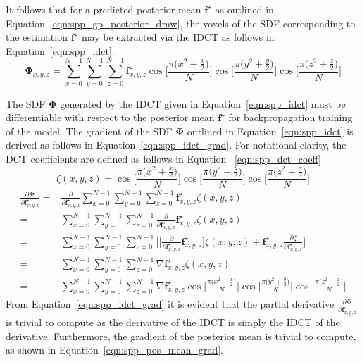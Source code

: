 It follows that for a predicted posterior mean \( \bm{f}^{\star} \) as outlined in 
Equation~\ref{eqn:spp_gp_posterior_draw}, the voxels of the SDF corresponding to the 
estimation \( \bm{f}^{\star} \) may be extracted via the IDCT as follows in 
Equation~\ref{eqn:spp_idct}.
\begin{equation}
  \label{eqn:spp_idct}
  \bm{\Phi}_{x, y, z} = \sum_{x=0}^{N-1} \sum_{y=0}^{N-1} \sum_{z=0}^{N-1} 
  \bm{f}^{\star}_{x, y, z}
  \cos \Big[ \frac{\pi \big( x^{2} + \frac{x}{2} \big)}{N} \Big]
  \cos \Big[ \frac{\pi \big( y^{2} + \frac{y}{2} \big)}{N} \Big]
  \cos \Big[ \frac{\pi \big( z^{2} + \frac{z}{2} \big)}{N} \Big]
\end{equation}

The SDF \( \bm{\Phi} \) generated by the IDCT given in Equation~\ref{eqn:spp_idct} must be 
differentiable with respect to the posterior mean \( \bm{f}^{\star} \) for backpropagation 
training of the model. The gradient of the SDF \( \bm{\Phi} \) outlined in 
Equation~\ref{eqn:spp_idct} is derived as follows in Equation~\ref{eqn:spp_idct_grad}. 
For notational clarity, the DCT coefficients are defined as follows in Equation
~\ref{eqn:spp_dct_coeff}
\begin{equation}
  \label{eqn:spp_dct_coeff}
  \zeta(x, y, z) = 
  \cos \Big[ \frac{\pi \big( x^{2} + \frac{x}{2} \big)}{N} \Big]
  \cos \Big[ \frac{\pi \big( y^{2} + \frac{y}{2} \big)}{N} \Big]
  \cos \Big[ \frac{\pi \big( z^{2} + \frac{z}{2} \big)}{N} \Big]
\end{equation}
\begin{align}
  \label{eqn:spp_idct_grad}
  \frac{\partial \bm{\Phi}}{\partial \bm{f}_{x, y, z}^{\star}} ={}&
  \frac{\partial}{\partial \bm{f}_{x, y, z}^{\star}}
  \sum_{x=0}^{N-1} \sum_{y=0}^{N-1} \sum_{z=0}^{N-1} 
  \bm{f}^{\star}_{x, y, z} \zeta(x, y, z)\\
  ={}& \sum_{x=0}^{N-1} \sum_{y=0}^{N-1} \sum_{z=0}^{N-1} 
  \frac{\partial}{\partial \bm{f}_{x, y, z}^{\star}} \bm{f}^{\star}_{x, y, z}
  \zeta(x, y, z)\\
  ={}& \sum_{x=0}^{N-1} \sum_{y=0}^{N-1} \sum_{z=0}^{N-1} \Bigg[
    \Bigg[ 
      \frac{\partial}{\partial \bm{f}_{x, y, z}^{\star}} \bm{f}^{\star}_{x, y, z} 
    \Bigg] \zeta(x, y, z)
    + \bm{f}_{x, y, z}^{\star} \frac{\partial \zeta}{\partial \bm{f}_{x, y, z}^{\star}}
  \Bigg]\\
  ={}& \sum_{x=0}^{N-1} \sum_{y=0}^{N-1} \sum_{z=0}^{N-1}
  \nabla \bm{f}_{x, y, z}^{\star} \zeta(x, y, z)\\
  ={}& \sum_{x=0}^{N-1} \sum_{y=0}^{N-1} \sum_{z=0}^{N-1} 
  \nabla \bm{f}^{\star}_{x, y, z}
  \cos \Big[ \frac{\pi \big( x^{2} + \frac{x}{2} \big)}{N} \Big]
  \cos \Big[ \frac{\pi \big( y^{2} + \frac{y}{2} \big)}{N} \Big]
  \cos \Big[ \frac{\pi \big( z^{2} + \frac{z}{2} \big)}{N} \Big]
\end{align}
From Equation~\ref{eqn:spp_idct_grad} it is evident that the partial derivative 
\( \frac{\partial \bm{\Phi}}{\partial \bm{f}_{x, y, z}^{\star}} \) is trivial 
to compute as the derivative of the IDCT is simply the IDCT of the derivative. 
Furthermore, the gradient of the posterior mean is trivial to compute, as shown 
in Equation~\ref{eqn:spp_pos_mean_grad}.

